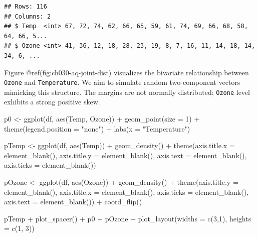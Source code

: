 \documentclass{article}
\newenvironment{Shaded}{\begin{snugshade}}{\end{snugshade}}
\newcommand{\AttributeTok}[1]{\textcolor[rgb]{0.77,0.63,0.00}{#1}}
\newcommand{\DecValTok}[1]{\textcolor[rgb]{0.00,0.00,0.81}{#1}}
\newcommand{\FunctionTok}[1]{\textcolor[rgb]{0.00,0.00,0.00}{#1}}
\newcommand{\NormalTok}[1]{#1}
\newcommand{\OtherTok}[1]{\textcolor[rgb]{0.56,0.35,0.01}{#1}}
\newcommand{\SpecialCharTok}[1]{\textcolor[rgb]{0.00,0.00,0.00}{#1}}
\newcommand{\StringTok}[1]{\textcolor[rgb]{0.31,0.60,0.02}{#1}}
\begin{document}
\begin{verbatim}
## Rows: 116
## Columns: 2
## $ Temp  <int> 67, 72, 74, 62, 66, 65, 59, 61, 74, 69, 66, 68, 58, 64, 66, 5...
## $ Ozone <int> 41, 36, 12, 18, 28, 23, 19, 8, 7, 16, 11, 14, 18, 14, 34, 6, ...
\end{verbatim}

Figure @ref(fig:ch030-aq-joint-dist) visualizes the bivariate
relationship between \texttt{Ozone} and \texttt{Temperature}. We aim to
simulate random two-component vectors mimicking this structure. The
margins are not normally distributed; \texttt{Ozone} level exhibits a
strong positive skew.

\begin{Shaded}
\begin{Highlighting}[]
\NormalTok{p0 }\OtherTok{\textless{}{-}} \FunctionTok{ggplot}\NormalTok{(df, }\FunctionTok{aes}\NormalTok{(Temp, Ozone)) }\SpecialCharTok{+}
  \FunctionTok{geom\_point}\NormalTok{(}\AttributeTok{size =} \DecValTok{1}\NormalTok{) }\SpecialCharTok{+}
  \FunctionTok{theme}\NormalTok{(}\AttributeTok{legend.position =} \StringTok{"none"}\NormalTok{) }\SpecialCharTok{+} 
  \FunctionTok{labs}\NormalTok{(}\AttributeTok{x =} \StringTok{"Temperature"}\NormalTok{)}

\NormalTok{pTemp }\OtherTok{\textless{}{-}} \FunctionTok{ggplot}\NormalTok{(df, }\FunctionTok{aes}\NormalTok{(Temp)) }\SpecialCharTok{+} 
  \FunctionTok{geom\_density}\NormalTok{() }\SpecialCharTok{+}
  \FunctionTok{theme}\NormalTok{(}\AttributeTok{axis.title.x =} \FunctionTok{element\_blank}\NormalTok{(),}
        \AttributeTok{axis.title.y =} \FunctionTok{element\_blank}\NormalTok{(),}
        \AttributeTok{axis.text =} \FunctionTok{element\_blank}\NormalTok{(),}
        \AttributeTok{axis.ticks =} \FunctionTok{element\_blank}\NormalTok{())}

\NormalTok{pOzone }\OtherTok{\textless{}{-}} \FunctionTok{ggplot}\NormalTok{(df, }\FunctionTok{aes}\NormalTok{(Ozone)) }\SpecialCharTok{+} 
    \FunctionTok{geom\_density}\NormalTok{() }\SpecialCharTok{+}
  \FunctionTok{theme}\NormalTok{(}\AttributeTok{axis.title.y =} \FunctionTok{element\_blank}\NormalTok{(),}
        \AttributeTok{axis.title.x =} \FunctionTok{element\_blank}\NormalTok{(),}
        \AttributeTok{axis.ticks =} \FunctionTok{element\_blank}\NormalTok{(),}
        \AttributeTok{axis.text =} \FunctionTok{element\_blank}\NormalTok{()) }\SpecialCharTok{+}
  \FunctionTok{coord\_flip}\NormalTok{()}

\NormalTok{pTemp }\SpecialCharTok{+} \FunctionTok{plot\_spacer}\NormalTok{() }\SpecialCharTok{+}\NormalTok{ p0 }\SpecialCharTok{+}\NormalTok{ pOzone }\SpecialCharTok{+} 
  \FunctionTok{plot\_layout}\NormalTok{(}\AttributeTok{widths =} \FunctionTok{c}\NormalTok{(}\DecValTok{3}\NormalTok{,}\DecValTok{1}\NormalTok{), }\AttributeTok{heights =} \FunctionTok{c}\NormalTok{(}\DecValTok{1}\NormalTok{, }\DecValTok{3}\NormalTok{)) }
\end{Highlighting}
\end{Shaded}
\end{document}
